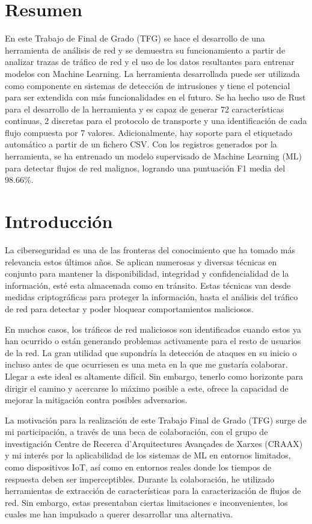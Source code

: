\documentclass[10pt,a4paper,twoside]{article}
\begin{document}
\begin{multicols*}{2}
    \section*{Resumen}

    En este Trabajo de Final de Grado (TFG) se hace el desarrollo de una herramienta de análisis de red y se demuestra su funcionamiento a partir de analizar trazas de tráfico de red y el uso de los datos resultantes para entrenar modelos con Machine Learning. La herramienta desarrollada puede ser utilizada como componente en sistemas  de detección de intrusiones y tiene el potencial para ser extendida con más funcionalidades en el futuro. Se ha hecho uso de Rust para el desarrollo de la herramienta y es capaz de generar 72 características continuas, 2 discretas para el protocolo de transporte y una identificación de cada flujo compuesta por 7 valores. Adicionalmente, hay soporte para el etiquetado automático a partir de un fichero CSV. Con los registros generados por la herramienta, se ha entrenado un modelo supervisado de Machine Learning (ML) para detectar flujos de red malignos, logrando una puntuación F1 media del 98.66\%.

    \section{Introducción}
    
    La ciberseguridad es una de las fronteras del conocimiento que ha tomado más relevancia estos últimos años. Se aplican numerosas y diversas técnicas en conjunto para mantener la disponibilidad, integridad y confidencialidad de la información, esté esta almacenada como en tránsito. Estas técnicas van desde medidas criptográficas para proteger la información, hasta el análisis del tráfico de red para detectar y poder bloquear comportamientos maliciosos.

    En muchos casos, los tráficos de red maliciosos son identificados cuando estos ya han ocurrido o están generando problemas activamente para el resto de usuarios de la red. La gran utilidad que supondría la detección de ataques en su inicio o incluso antes de que ocurriesen es una meta en la que me gustaría colaborar. Llegar a este ideal es altamente difícil. Sin embargo, tenerlo como horizonte para dirigir el camino y acercarse lo máximo posible a este, ofrece la capacidad de mejorar la mitigación contra posibles adversarios.
    
    La motivación para la realización de este Trabajo Final de Grado (TFG) surge de mi participación, a través de una beca de colaboración, con el grupo de investigación Centre de Recerca d’Arquitectures Avançades de Xarxes (CRAAX) y mi interés por la aplicabilidad de los sistemas de ML en entornos limitados, como dispositivos IoT, así como en entornos reales donde los tiempos de respuesta deben ser imperceptibles. Durante la colaboración, he utilizado herramientas de extracción de características para la caracterización de flujos de red. Sin embargo, estas presentaban ciertas limitaciones e inconvenientes, los cuales me han impulsado a querer desarrollar una alternativa.


\end{multicols*}
\end{document}

